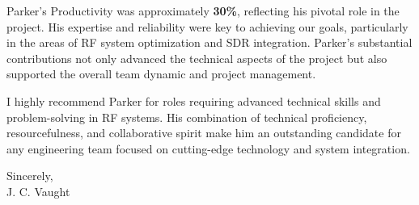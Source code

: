 \documentclass[11pt]{article}
\begin{document}
\begin{flushleft}
Parker’s Productivity was approximately \textbf{30\%}, reflecting his pivotal role in the project. His expertise and reliability were key to achieving our goals, particularly in the areas of RF system optimization and SDR integration. Parker’s substantial contributions not only advanced the technical aspects of the project but also supported the overall team dynamic and project management.

I highly recommend Parker for roles requiring advanced technical skills and problem-solving in RF systems. His combination of technical proficiency, resourcefulness, and collaborative spirit make him an outstanding candidate for any engineering team focused on cutting-edge technology and system integration.

\vspace{12pt}

Sincerely, \\
J. C. Vaught

\end{flushleft}

\newpage
\end{document}
